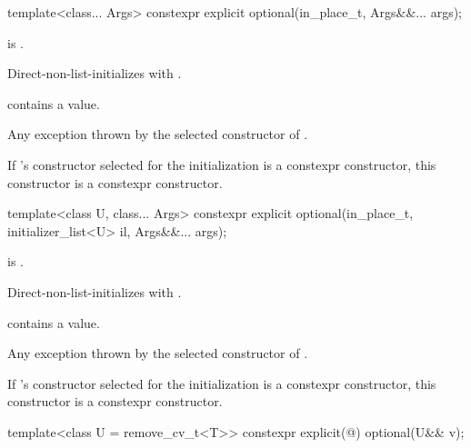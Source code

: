 %
\begin{itemdecl}
template<class... Args> constexpr explicit optional(in_place_t, Args&&... args);
\end{itemdecl}

\begin{itemdescr}
\pnum
\constraints
{} is .

\pnum
\effects
Direct-non-list-initializes 
with .

\pnum
\ensures
{} contains a value.

\pnum
\throws
Any exception thrown by the selected constructor of .

\pnum
\remarks
If 's constructor selected for the initialization is a constexpr constructor, this constructor is a constexpr constructor.
\end{itemdescr}

%
\begin{itemdecl}
template<class U, class... Args>
  constexpr explicit optional(in_place_t, initializer_list<U> il, Args&&... args);
\end{itemdecl}

\begin{itemdescr}
\pnum
\constraints
{} is .

\pnum
\effects
Direct-non-list-initializes 
with .

\pnum
\ensures
{} contains a value.

\pnum
\throws
Any exception thrown by the selected constructor of .

\pnum
\remarks
If 's constructor selected for the initialization is a constexpr constructor, this constructor is a constexpr constructor.
\end{itemdescr}

%
\begin{itemdecl}
template<class U = remove_cv_t<T>> constexpr explicit(@\seebelow@) optional(U&& v);
\end{itemdecl}

